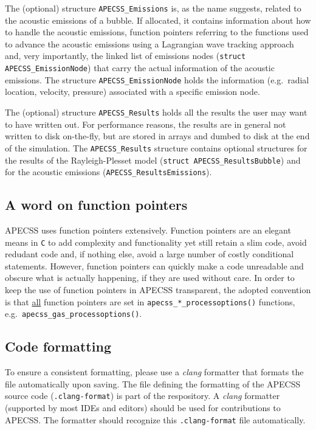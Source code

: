 The (optional) structure {\tt APECSS\_Emissions} is, as the name suggests, related to the acoustic emissions of a bubble. If allocated, it contains information about how to handle the acoustic emissions, function pointers referring to the functions used to advance the acoustic emissions using a Lagrangian wave tracking approach and, very importantly, the linked list of emissions nodes ({\tt struct APECSS\_EmissionNode}) that carry the actual information of the acoustic emissions. The structure {\tt APECSS\_EmissionNode}  holds the information (e.g.~radial location, velocity, pressure) associated with a specific emission node.

The (optional) structure {\tt APECSS\_Results} holds all the results the user may want to have written out. For performance reasons, the results are in general not written to disk on-the-fly, but are stored in arrays and dumbed to disk at the end of the simulation. The {\tt APECSS\_Results} structure contains optional structures for the results of the Rayleigh-Plesset model ({\tt struct APECSS\_ResultsBubble}) and for the acoustic emissions ({\tt APECSS\_ResultsEmissions}).


\subsection{A word on function pointers}

APECSS uses function pointers extensively. Function pointers are an elegant means in {\tt C} to add complexity and functionality yet still retain a slim code, avoid redudant code and, if nothing else, avoid a large number of costly conditional statements. However, function pointers can quickly make a code unreadable and obscure what is actually happening, if they are used without care. In order to keep the use of function pointers in APECSS transparent, the adopted convention is that \underline{all} function pointers are set in {\tt apecss\_*\_processoptions()} functions, e.g.~{\tt apecss\_gas\_processoptions()}.

\subsection{Code formatting}
\label{sec:clang}

To ensure a consistent formatting, please use a \textit{clang} formatter that formats the file automatically upon saving. The file defining the formatting of the APECSS source code ({\tt .clang-format}) is part of the respository. A \textit{clang} formatter (supported by most IDEs and editors) should be used for contributions to APECSS. The formatter should recognize this {\tt .clang-format} file automatically.

